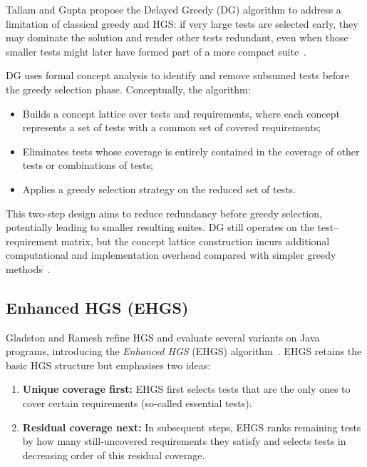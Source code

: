 Tallam and Gupta propose the Delayed Greedy (DG) algorithm to address a limitation
of classical greedy and HGS: if very large tests are selected early, they may
dominate the solution and render other tests redundant, even when those smaller
tests might later have formed part of a more compact suite~\cite{tallam2005}.

DG uses formal concept analysis to identify and remove subsumed tests before the
greedy selection phase. Conceptually, the algorithm:

\begin{itemize}
  \item Builds a concept lattice over tests and requirements, where each concept
        represents a set of tests with a common set of covered requirements;
  \item Eliminates tests whose coverage is entirely contained in the coverage
        of other tests or combinations of tests;
  \item Applies a greedy selection strategy on the reduced set of tests.
\end{itemize}

This two-step design aims to reduce redundancy before greedy selection, potentially
leading to smaller resulting suites. DG still operates on the test--requirement
matrix, but the concept lattice construction incurs additional computational and
implementation overhead compared with simpler greedy methods~\cite{tallam2005}.

\subsection{Enhanced HGS (EHGS)}

Gladston and Ramesh refine HGS and evaluate several variants on Java programs,
introducing the \emph{Enhanced HGS} (EHGS) algorithm~\cite{gladston2015}. EHGS
retains the basic HGS structure but emphasises two ideas:

\begin{enumerate}
  \item \textbf{Unique coverage first:} EHGS first selects tests that are the only
        ones to cover certain requirements (so-called essential tests).
  \item \textbf{Residual coverage next:} In subsequent steps, EHGS ranks remaining
        tests by how many still-uncovered requirements they satisfy and selects tests
        in decreasing order of this residual coverage.
\end{enumerate}

